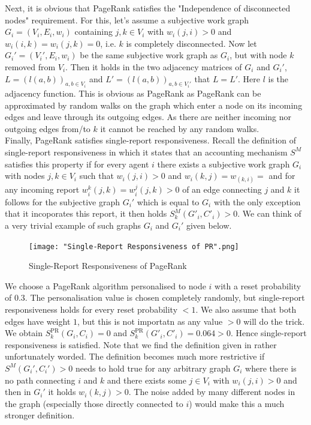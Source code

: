\documentclass[11pt,a4paper]{report}
\theoremstyle{definition}
\theoremstyle{theorem}
\theoremstyle{proposition}
\theoremstyle{corollary}
\theoremstyle{lemma}
\theoremstyle{example}
\theoremstyle{remark}
\begin{document}
\noindent{}Next, it is obvious that PageRank satisfies the "Independence of disconnected nodes" requirement. For this, let's assume a subjective work graph $G_i=(V_i,E_i,w_i)$ containing $j,k\in{}V_i$ with $w_i(j,i)>0$ and $w_i(i,k)=w_i(j,k)=0$, i.e. $k$ is completely disconnected. Now let $G_i'=(V_i',E_i,w_i)$ be the same subjective work graph as $G_i$, but with node $k$ removed from $V_i$. Then it holds in the two adjacency matrices of $G_i$ and $G_i'$, $L=(l(a,b))_{a,b\in{}V_i}$ and $L'=(l(a,b))_{a,b\in{}V_i'}$ that $L=L'$. Here $l$ is the adjacency function. This is obvious as PageRank as PageRank can be approximated by random walks on the graph which enter a node on its incoming edges and leave through its outgoing edges. As there are neither incoming nor outgoing edges from/to $k$ it cannot be reached by any random walks. \vspace{1em}\\

\noindent{}Finally, PageRank satisfies single-report responsiveness. Recall the definition of single-report responsiveness in which it states that an accounting mechanism $S^M$ satisfies this property if for every agent $i$ there exists a subjective work graph $G_i$ with nodes $j,k\in{}V_i$ such that $w_i(j,i)>0$ and $w_i(k,j)=w_(k,i)=$ and for any incoming report $w_i^k(j,k)=w_i^j(j,k)>0$ of an edge connecting $j$ and $k$ it follows for the subjective graph $G_i'$ which is equal to $G_i$ with the only exception that it incoporates this report, it then holds $S^M_k(G'_i,C'_i)>0$. We can think of a very trivial example of such graphs $G_i$ and $G_i'$ given below.\vspace{1em}\\

\begin{figure}[H]
\begin{center}
\texttt{[image: "Single-Report Responsiveness of PR".png]}
\caption{Single-Report Responsiveness of PageRank}
\label{fig:Single-Report Reponsiveness of PageRank}
\end{center}
\end{figure}

\noindent{}We choose a PageRank algorithm personalised to node $i$ with a reset probability of $0.3$. The personalisation value is chosen completely randomly, but single-report responsiveness holds for every reset probability $<1$. We also assume that both edges have weight $1$, but this is not importatn as any value $>0$ will do the trick. We obtain $S^{\text{PR}}_k(G_i,C_i)=0$ and $S^{\text{PR}}_k(G'_i,C'_i)=0.064>0$. Hence single-report responsiveness is satisfied. Note that we find the definition given in \cite{On the Sybil-Proofness of Accounting Mechanisms} rather unfortunately worded. The definition becomes much more restrictive if $S^M(G_i',C_i')>0$ needs to hold true for any arbitrary graph $G_i$ where there is no path connecting $i$ and $k$ and there exists some $j\in{}V_i$ with $w_i(j,i)>0$ and then in $G_i'$ it holds $w_i(k,j)>0$. The noise added by many different nodes in the graph (especially those directly connected to $i$) would make this a much stronger definition. \vspace{1em}\\
\end{document}
